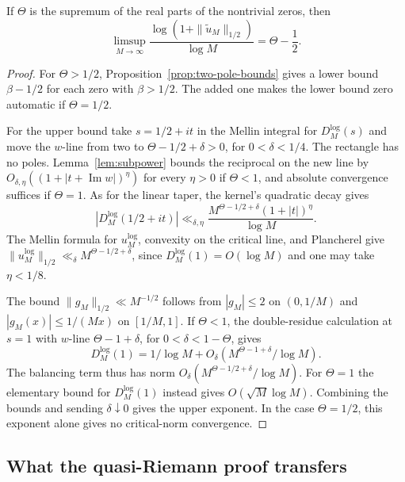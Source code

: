\begin{corollary}
If \(\Theta\) is the supremum of the real parts of the nontrivial zeros, then
\[
 \limsup_{M\to\infty}
 \frac{\log(1+\|\widetilde u_M\|_{1/2})}{\log M}
 =\Theta-\frac12 .
\]
\end{corollary}
\begin{proof}
For \(\Theta>1/2\), Proposition~\ref{prop:two-pole-bounds} gives a lower bound \(\beta-1/2\) for each zero with \(\beta>1/2\). The added one makes the lower bound zero automatic if \(\Theta=1/2\).

For the upper bound take \(s=1/2+it\) in the Mellin integral for \(D_M^{\log}(s)\) and move the \(w\)-line from two to \(\Theta-1/2+\delta>0\), for \(0<\delta<1/4\). The rectangle has no poles. Lemma~\ref{lem:subpower} bounds the reciprocal on the new line by \(O_{\delta,\eta}((1+|t+\operatorname{Im}w|)^\eta)\) for every \(\eta>0\) if \(\Theta<1\), and absolute convergence suffices if \(\Theta=1\). As for the linear taper, the kernel's quadratic decay gives
\[
 |D_M^{\log}(1/2+it)|
 \ll_{\delta,\eta} \frac{M^{\Theta-1/2+\delta}(1+|t|)^\eta}{\log M}.
\]
The Mellin formula for \(u_M^{\log}\), convexity on the critical line, and Plancherel give \(\|u_M^{\log}\|_{1/2}\ll_\delta M^{\Theta-1/2+\delta}\), since \(D_M^{\log}(1)=O(\log M)\) and one may take \(\eta<1/8\).

The bound \(\|g_M\|_{1/2}\ll M^{-1/2}\) follows from \(|g_M|\le2\) on \((0,1/M)\) and \(|g_M(x)|\le1/(Mx)\) on \([1/M,1]\). If \(\Theta<1\), the double-residue calculation at \(s=1\) with \(w\)-line \(\Theta-1+\delta\), for \(0<\delta<1-\Theta\), gives
\[
 D_M^{\log}(1)=1/\log M+O_\delta(M^{\Theta-1+\delta}/\log M).
\]
The balancing term thus has norm \(O_\delta(M^{\Theta-1/2+\delta}/\log M)\). For \(\Theta=1\) the elementary bound for \(D_M^{\log}(1)\) instead gives \(O(\sqrt M\log M)\). Combining the bounds and sending \(\delta\downarrow0\) gives the upper exponent. In the case \(\Theta=1/2\), this exponent alone gives no critical-norm convergence.
\end{proof}

\subsection{What the quasi-Riemann proof transfers}


